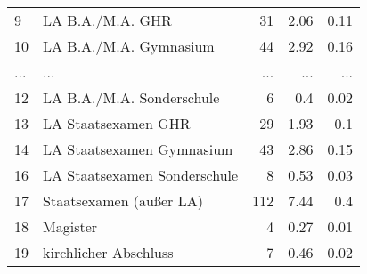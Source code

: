 \begin{longtable}{lXrrr}
        9 & \multicolumn{1}{X}{LA B.A./M.A. GHR} & %
          \num{31} &
          \num[round-mode=places,round-precision=2]{2.06} &
          \num[round-mode=places,round-precision=2]{0.11} \\
        10 & \multicolumn{1}{X}{LA B.A./M.A. Gymnasium} & %
          \num{44} &
          \num[round-mode=places,round-precision=2]{2.92} &
          \num[round-mode=places,round-precision=2]{0.16} \\
       ... & ... & ... & ... & ... \\
        12 & \multicolumn{1}{X}{LA B.A./M.A. Sonderschule} & %
          \num{6} &
          \num[round-mode=places,round-precision=2]{0.4} &
          \num[round-mode=places,round-precision=2]{0.02} \\

        13 & \multicolumn{1}{X}{LA Staatsexamen GHR} & %
          \num{29} &
          \num[round-mode=places,round-precision=2]{1.93} &
          \num[round-mode=places,round-precision=2]{0.1} \\

        14 & \multicolumn{1}{X}{LA Staatsexamen Gymnasium} & %
          \num{43} &
          \num[round-mode=places,round-precision=2]{2.86} &
          \num[round-mode=places,round-precision=2]{0.15} \\

        16 & \multicolumn{1}{X}{LA Staatsexamen Sonderschule} & %
          \num{8} &
          \num[round-mode=places,round-precision=2]{0.53} &
          \num[round-mode=places,round-precision=2]{0.03} \\

        17 & \multicolumn{1}{X}{Staatsexamen (außer LA)} & %
          \num{112} &
          \num[round-mode=places,round-precision=2]{7.44} &
          \num[round-mode=places,round-precision=2]{0.4} \\

        18 & \multicolumn{1}{X}{Magister} & %
          \num{4} &
          \num[round-mode=places,round-precision=2]{0.27} &
          \num[round-mode=places,round-precision=2]{0.01} \\

        19 & \multicolumn{1}{X}{kirchlicher Abschluss} & %
          \num{7} &
          \num[round-mode=places,round-precision=2]{0.46} &
          \num[round-mode=places,round-precision=2]{0.02} \\


\end{longtable}

